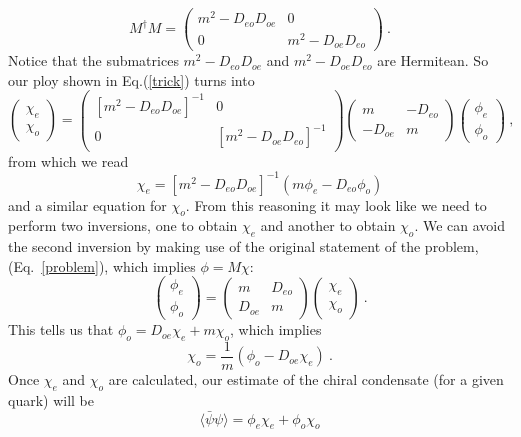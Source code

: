 \documentclass[a4paper,10pt]{article}
\begin{document}
\[ M^\dagger M = \left( 
\begin{array}{cc}
m^2 - D_{eo} D_{oe} & 0 \\
0 &   m^2 - D_{oe} D_{eo}
\end{array} 
\right) \ . \]
Notice that the submatrices $m^2 - D_{eo} D_{oe}$ and $m^2 - D_{oe} D_{eo}$ are 
Hermitean. So our ploy shown in Eq.(\ref{trick}) turns into
\[ \left( \begin{array}{c}
\chi_e \\
\chi_o
\end{array} \right)
= \left( 
\begin{array}{cc}
\left[m^2 - D_{eo} D_{oe}\right]^{-1} & 0 \\
0 &   \left[m^2 - D_{oe} D_{eo} \right]^{-1}
\end{array}  
\right) \left( 
\begin{array}{cc}
m   &  -D_{eo} \\
-D_{oe}   & m
\end{array}\right)
\left(
\begin{array}{c}
\phi_e \\
\phi_o
\end{array}
\right) \ ,
\] 
from which we read
\begin{equation}
\chi_e = \left[m^2 - D_{eo} D_{oe}\right]^{-1} \left( m \phi_e - D_{eo} 
\phi_o\right)
\end{equation}
and a similar equation for $\chi_o$. From this reasoning it may look like we 
need to perform two inversions, one to obtain $\chi_e$ and another to obtain 
$\chi_o$. We can avoid the second inversion by making use of the original 
statement of the problem, (Eq.~\ref{problem}), which implies $\phi = M \chi$:
\[
\left( \begin{array}{c}
\phi_e \\
\phi_o
\end{array}
\right)  =   \left( \begin{array}{cc}
m & D_{eo} \\
D_{oe} & m 
\end{array}
\right) \left( 
\begin{array}{c}
 \chi_e \\
 \chi_o
\end{array}
 \right) \ . 
\]
This tells us that $\phi_o = D_{oe} \chi_e + m \chi_o$, which implies
\[
 \chi_o = \frac{1}{m} \left( \phi_o - D_{oe} \chi_e \right) \ . 
\]
Once $\chi_e$ and $\chi_o$ are calculated, our estimate of the chiral 
condensate (for a given quark) will be
\begin{equation}
\langle \bar{\psi} \psi \rangle = \phi_e\chi_e + \phi_o \chi_o  
\end{equation}
\end{document}
